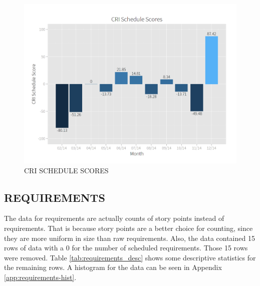 \documentclass[SDSUThesis.tex]{subfiles}
\begin{document}
        \begin{figure}[htb]
            \centering
            \includegraphics[scale=.25]{images/schedule_scores.png}
            \caption{CRI SCHEDULE SCORES}
            \label{fig:schedule-scores}
        \end{figure}
        
        
    \subsection{REQUIREMENTS}
    \label{sec:case-req}
        The data for requirements are actually counts of story points
        instead of requirements.  That is because story points
        are a better choice for counting, since they are more
        uniform in size than raw requirements.  Also, the data
        contained 15 rows of data with a 0 for the number of
        scheduled requirements.  Those 15 rows were removed.
        Table \ref{tab:requirements_desc} shows some descriptive
        statistics for the remaining rows. A histogram for the
        data can be seen in Appendix \ref{app:requirements-hist}.
        
\end{document}
